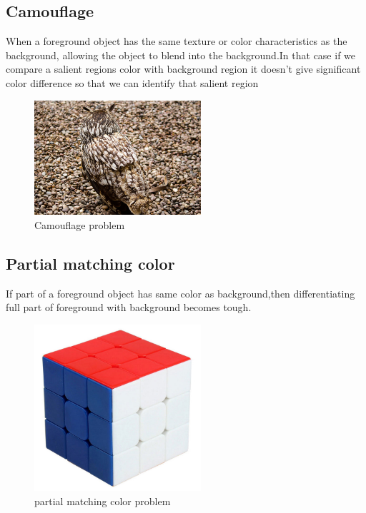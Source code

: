 \subsection{Camouflage}
When a foreground object has the same texture or color characteristics as the background, allowing the object to blend into the background.In that case if we compare a salient regions color with background region it doesn't give significant color difference so that we can identify that salient region  

\begin{figure}[here]
  \centering
  \includegraphics[width=0.55\textwidth,height=0.5\textwidth]{pictures/owl.jpg}
  \caption{Camouflage problem \protect\footnotemark}
  
  \label{orangeleaf}

\end{figure}
 
\subsection{Partial matching color}
If part of a foreground object has same color as background,then differentiating full part of foreground with background becomes tough.


 
 
\begin{figure}[here]
  \centering
  \includegraphics[width=0.55\textwidth,height=0.5\textwidth]{pictures/rubik.jpg}
  
  \caption{partial matching color problem \protect\footnotemark}
  
  \label{partial matching color}

\end{figure} 


